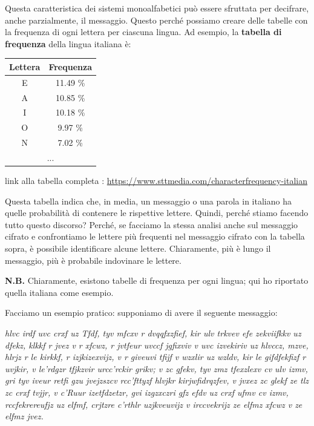 \documentclass{report}
\begin{document}
\vspace{0.2cm}
Questa caratteristica dei sistemi monoalfabetici può essere sfruttata per decifrare, anche parzialmente, il messaggio.  
Questo perché possiamo creare delle tabelle con la frequenza di ogni lettera per ciascuna lingua.  
Ad esempio, la \textbf{tabella di frequenza} della lingua italiana è:


\begin{table}[h]
\centering
    \begin{tabular}{cc}
\multicolumn{1}{c|}{Lettera} & Frequenza \\ \hline
\multicolumn{1}{c|}{E}       & 11.49 \%  \\
\multicolumn{1}{c|}{A}       & 10.85 \%  \\
\multicolumn{1}{c|}{I}       & 10.18 \%  \\
\multicolumn{1}{c|}{O}       & 9.97 \%   \\
\multicolumn{1}{c|}{N}       & 7.02 \%   \\
\multicolumn{2}{c}{...}                 
\end{tabular}
\end{table}

\begin{center}
    
link alla tabella completa : \href{https://www.sttmedia.com/characterfrequency-italian}{https://www.sttmedia.com/characterfrequency-italian}
\end{center}

Questa tabella indica che, in media, un messaggio o una parola in italiano ha quelle probabilità di contenere le rispettive lettere.  
Quindi, perché stiamo facendo tutto questo discorso? Perché, se facciamo la stessa analisi anche sul messaggio cifrato e confrontiamo le lettere più frequenti nel messaggio cifrato con la tabella sopra, è possibile identificare alcune lettere.  
Chiaramente, più è lungo il messaggio, più è probabile indovinare le lettere.


\textbf{N.B.} Chiaramente, esistono tabelle di frequenza per ogni lingua; qui ho riportato quella italiana come esempio.

\newpage

Facciamo un esempio pratico: supponiamo di avere il seguente messaggio:
\vspace{0.2cm}

\textit{hlvc irdf uvc crxf uz Tfdf, tyv mfcxv r dvqqfxzfief, kir ulv trkvev efe zekviifkkv uz dfekz, klkkf r jvez v r xfcwz, r jvtfeur uvccf jgfixviv v uvc izvekiriv uz hlvccz, mzve, hlrjz r le kirkkf, r izjkizexvijz, v r giveuvi tfijf v wzxlir uz wzldv, kir le gifdfekfizf r uvjkir, v le’rdgzr tfjkzvir urcc’rckir grikv; v zc gfekv, tyv zmz tfexzlexv cv ulv izmv, gri tyv iveur retfi gzu jvejzszcv rcc’fttyzf hlvjkr kirjwfidrqzfev, v jvxez zc glekf ze tlz zc crxf tvjjr, v c’Ruur izetfdzetzr, gvi izgzxczri gfz efdv uz crxf ufmv cv izmv, rccfekrereufjz uz elfmf, crjtzre c’rthlr uzjkveuvijz v irccvekrijz ze elfmz xfcwz v ze elfmz jvez. }
\vspace{0.2cm}
\end{document}
